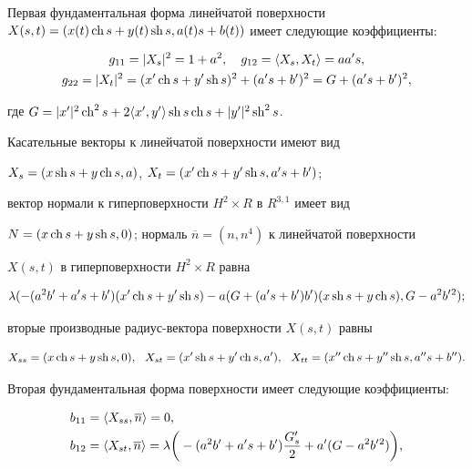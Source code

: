 \begin{pf}
Первая фундаментальная форма линейчатой поверхности $X(s,t) =


(x(t)\ch s+y(t)\sh s,a(t)s+b(t))$ имеет следующие коэффициенты:


\begin{gather*}


g_{11}=|X_s|^2=1+a^2,\quad g_{12}=\la X_s,X_t\ra=aa's,\\


g_{22}=|X_t|^2=(x'\ch s+y'\sh s)^2+(a's+b')^2= G+(a's+b')^2,


\end{gather*}


где $G=|x'|^2\operatorname{ch}^2s+2\langle x',y'\rangle\operatorname{sh} s\operatorname{ch} s+|y'|^2\operatorname{sh}^2s$.





Касательные векторы к линейчатой поверхности имеют вид


$X_s=(x\operatorname{sh} s+y\operatorname{ch} s,a)$, $X_t=(x'\operatorname{ch} s+y'\operatorname{sh} s,a's+b')$;


вектор нормали к гиперповерхности $H^2 \times R$ в $R^{3,1}$ имеет вид 


$N=(x\operatorname{ch} s+y\operatorname{sh} s,0)$; нормаль $ \overline n=(n,n^4)$ к линейчатой поверхности 


$X(s,t)$ в гиперповерхности $H^2 \times R$ равна 


$$


\lambda (-(a^2b'+a's+b')(x'\ch s+y'\sh s)-a(G+(a's+b')b')(x\sh s+y\ch s),


G-a^2b'{}^2);


$$


вторые производные радиус-вектора поверхности $X(s,t)$ равны


$$


X_{ss}=(x\ch s+y\sh s,0),\ \ X_{st}=(x'\sh s+y'\ch s,a'),


\ \ X_{tt}=(x''\ch s+y''\sh s,a''s+b'').


$$ 


Вторая фундаментальная форма поверхности имеет следующие коэффициенты:


\begin{align*}


b_{11}&=\la X_{ss}, \overline n \ra=0,\\


%


b_{12}&=\la X_{st}, \overline n\ra=


\lambda \bigg(-(a^2b'+a's+b') \frac{G'_s}{2}+a'(G-a^2b'{}^2)\bigg),\\



\end{align*}
\end{pf}
